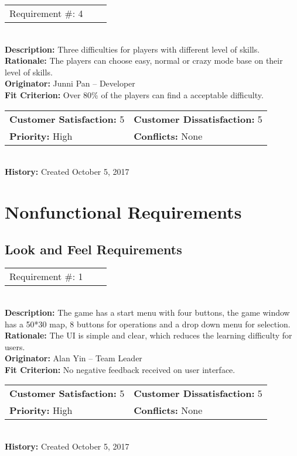 \documentclass[12pt]{article}
\begin{document}
\begin{reqbox}
\begin{tabular}{ccc}Requirement \#: 4
\end{tabular} \\
\textbf{Description:} Three difficulties for players with different level of skills.\\
\textbf{Rationale:} The players can choose easy, normal or crazy mode base on their level of skills.\\
\textbf{Originator:} Junni Pan -- Developer \\
\textbf{Fit Criterion:} Over 80\% of the players can find a acceptable difficulty.\\
\begin{tabular}{ll}
\textbf{Customer Satisfaction:} 5 & \textbf{Customer Dissatisfaction:} 5 \\
\textbf{Priority:} High & \textbf{Conflicts:} None\\
\end{tabular} \\
\textbf{History:} Created October 5, 2017
\end{reqbox}



\newpage
\section{Nonfunctional Requirements}


\subsection{Look and Feel Requirements}
\begin{reqbox}
\begin{tabular}{ccc}Requirement \#: 1
\end{tabular} \\
\textbf{Description:} The game has a start menu with four buttons, the game window has a 50*30 map, 8 buttons for operations and a drop down menu for selection.\\
\textbf{Rationale:} The UI is simple and clear, which reduces the learning difficulty for users.\\
\textbf{Originator:} Alan Yin -- Team Leader \\
\textbf{Fit Criterion:} No negative feedback received on user interface.\\
\begin{tabular}{ll}
\textbf{Customer Satisfaction:} 5 & \textbf{Customer Dissatisfaction:} 5 \\
\textbf{Priority:} High & \textbf{Conflicts:} None\\
\end{tabular} \\
\textbf{History:} Created October 5, 2017
\end{reqbox}
\end{document}

